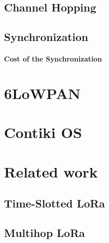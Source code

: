 \subsection{Channel Hopping}

\subsection{Synchronization}

\paragraph{Cost of the Synchronization}


\section{6LoWPAN}


\section{Contiki OS}

\section{Related work}

\subsection{Time-Slotted LoRa}

\subsection{Multihop LoRa}


